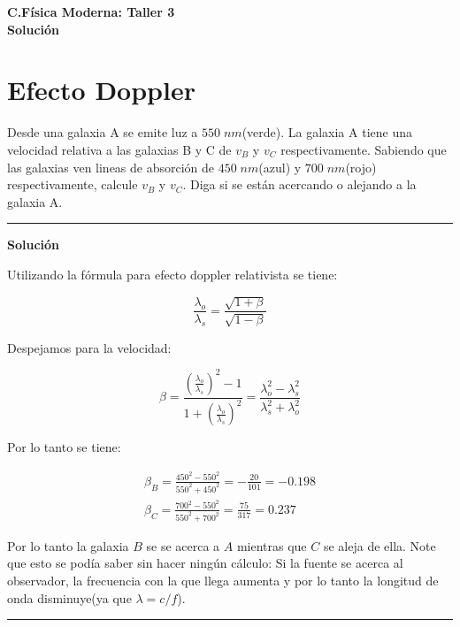 \documentclass[12pt]{article}
\begin{document}
 
\begin{center}
\Large \textbf{C.Física Moderna: Taller 3}\\
\normalsize \textbf{Solución}
\end{center}
 
  

\section{Efecto Doppler}

Desde una galaxia A se emite luz a $550\; nm$(verde). La galaxia A tiene una velocidad relativa a las galaxias B y C de $v_B$ y $v_C$ respectivamente. Sabiendo que las galaxias ven lineas de absorción  de $450\; nm$(azul) y $700\;nm$(rojo) respectivamente, calcule $v_B$ y $v_C$. Diga si se están acercando o alejando a la galaxia A.\\
\noindent\rule{16.5cm}{0.4pt}
\begin{center}
	\textbf{Solución}	
\end{center}


Utilizando la fórmula para efecto doppler relativista se tiene:

\begin{equation*}
 \frac{\lambda_o}{\lambda_s} = \frac{\sqrt{1+\beta}}{\sqrt{1-\beta}}
\end{equation*}

Despejamos para la velocidad:

\begin{equation}
\beta = \frac{\left( \frac{\lambda_o}{\lambda_s}\right)^2-1}{1+\left( \frac{\lambda_o}{\lambda_s}\right)^2} =\frac{\lambda_o^2-\lambda_s^2}{\lambda_s^2+\lambda_o^2}
\end{equation}


Por lo tanto se tiene:


\begin{align*}
\beta_B = \frac{ 450^2-550^2}{550^2 + 450^2} =- \frac{20}{101} = -0.198 \\
\beta_C = \frac{700^2-550^2}{550^2 + 700^2} = \frac{75}{317} = 0.237
\end{align*}

Por lo tanto la galaxia $B$ se se acerca a $A$ mientras que $C$ se aleja de ella. Note que esto se podía saber sin hacer ningún cálculo: Si la fuente se acerca al observador, la frecuencia con la que llega aumenta y por lo tanto la longitud de onda disminuye(ya que $\lambda = c/f$). 

\noindent\rule{16.5cm}{0.4pt}
\end{document}
